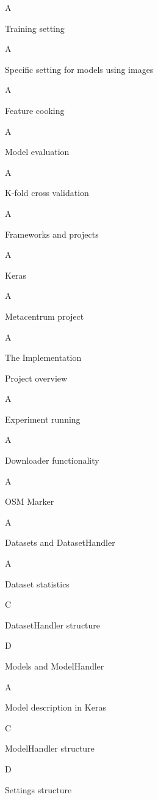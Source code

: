 A

\secc Training setting 

A

\secc Specific setting for models using images 

A

\secc Feature cooking 

A

\sec Model evaluation 

A

\secc K-fold cross validation 

A

\sec Frameworks and projects 

A

\secc Keras

A

\secc Metacentrum project

A

\chap The Implementation


\sec Project overview 

A

\sec Experiment running 

A

\sec Downloader functionality 

A

\sec OSM Marker 

A

\sec Datasets and DatasetHandler 

A

\secc Dataset statistics

C

\secc DatasetHandler structure

D

\sec Models and ModelHandler 

A


\secc Model description in Keras

C

\secc ModelHandler structure

D

\sec Settings structure 

